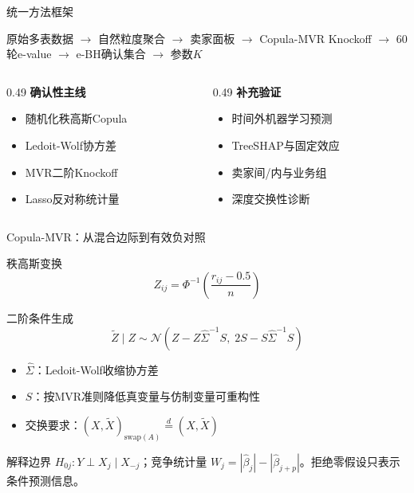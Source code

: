 \documentclass[aspectratio=169]{beamer}
\begin{document}
\begin{frame}{统一方法框架}
  \begin{center}
    \large
    原始多表数据
    $\rightarrow$ 自然粒度聚合
    $\rightarrow$ 卖家面板
    $\rightarrow$ Copula-MVR Knockoff
    $\rightarrow$ 60轮e-value
    $\rightarrow$ e-BH确认集合
    $\rightarrow$ 参数$K$
  \end{center}
  \vspace{0.5cm}
  \begin{columns}[T]
    \begin{column}{0.49\textwidth}
      \textbf{确认性主线}
      \begin{itemize}
        \item 随机化秩高斯Copula
        \item Ledoit-Wolf协方差
        \item MVR二阶Knockoff
        \item Lasso反对称统计量
      \end{itemize}
    \end{column}
    \begin{column}{0.49\textwidth}
      \textbf{补充验证}
      \begin{itemize}
        \item 时间外机器学习预测
        \item TreeSHAP与固定效应
        \item 卖家间/内与业务组
        \item 深度交换性诊断
      \end{itemize}
    \end{column}
  \end{columns}
\end{frame}

\begin{frame}[shrink=8]{Copula-MVR：从混合边际到有效负对照}
  \begin{block}{秩高斯变换}
    \begin{equation*}
      Z_{ij}=\Phi^{-1}\left(\frac{r_{ij}-0.5}{n}\right)
    \end{equation*}
  \end{block}
  \begin{block}{二阶条件生成}
    \begin{equation*}
      \widetilde Z\mid Z\sim
      \mathcal N\left(
        Z-Z\widehat\Sigma^{-1}S,\;
        2S-S\widehat\Sigma^{-1}S
      \right)
    \end{equation*}
  \end{block}
  \begin{itemize}
    \item $\widehat\Sigma$：Ledoit-Wolf收缩协方差
    \item $S$：按MVR准则降低真变量与仿制变量可重构性
    \item 交换要求：$(X,\widetilde X)_{\mathrm{swap}(A)}\overset d=(X,\widetilde X)$
  \end{itemize}
  \begin{alertblock}{解释边界}
    $H_{0j}:Y\perp X_j\mid X_{-j}$；竞争统计量
    $W_j=|\widehat\beta_j|-|\widehat\beta_{j+p}|$。拒绝零假设只表示条件预测信息。
  \end{alertblock}
\end{frame}
\end{document}
